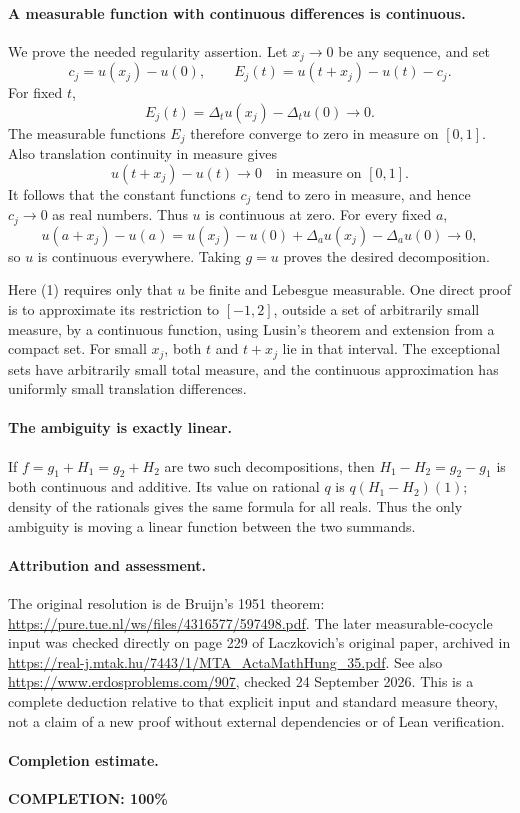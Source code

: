 \paragraph{A measurable function with continuous differences is continuous.}
We prove the needed regularity assertion.
Let \(x_j\to0\) be any sequence, and set
\[
 c_j=u(x_j)-u(0),\qquad
 E_j(t)=u(t+x_j)-u(t)-c_j.
\]
For fixed \(t\),
\[
 E_j(t)=\Delta_tu(x_j)-\Delta_tu(0)\longrightarrow0.
\]
The measurable functions \(E_j\) therefore converge
to zero in measure on \([0,1]\).
Also translation continuity in measure gives
\[
 u(t+x_j)-u(t)\longrightarrow0
 \quad\text{in measure on }[0,1].
\tag{1}
\]
It follows that the constant functions \(c_j\) tend to
zero in measure, and hence \(c_j\to0\) as real numbers.
Thus \(u\) is continuous at zero.
For every fixed \(a\),
\[
 u(a+x_j)-u(a)
 =u(x_j)-u(0)+\Delta_au(x_j)-\Delta_au(0)\longrightarrow0,
\]
so \(u\) is continuous everywhere. Taking \(g=u\)
proves the desired decomposition.

Here (1) requires only that \(u\) be finite and
Lebesgue measurable. One direct proof is to approximate
its restriction to \([-1,2]\), outside a set of arbitrarily
small measure, by a continuous function, using Lusin's
theorem and extension from a compact set.
For small \(x_j\), both \(t\) and \(t+x_j\) lie in that
interval. The exceptional sets have arbitrarily small
total measure, and the continuous approximation has
uniformly small translation differences.

\paragraph{The ambiguity is exactly linear.}
If \(f=g_1+H_1=g_2+H_2\) are two such decompositions,
then \(H_1-H_2=g_2-g_1\) is both continuous and additive.
Its value on rational \(q\) is \(q(H_1-H_2)(1)\);
density of the rationals gives the same formula
for all reals. Thus the only ambiguity is moving a
linear function between the two summands.

\paragraph{Attribution and assessment.}
The original resolution is de Bruijn's 1951 theorem:
\url{https://pure.tue.nl/ws/files/4316577/597498.pdf}.
The later measurable-cocycle input was checked directly
on page 229 of Laczkovich's original paper, archived in
\url{https://real-j.mtak.hu/7443/1/MTA_ActaMathHung_35.pdf}.
See also \url{https://www.erdosproblems.com/907},
checked 24 September 2026.
This is a complete deduction relative to that explicit
input and standard measure theory, not a claim of a
new proof without external dependencies or of Lean verification.

\paragraph{Completion estimate.}
\textbf{COMPLETION: 100\%}
